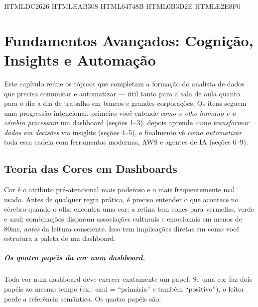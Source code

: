 
\definecolor{colAlerta}  {HTML}{DC2626}
\definecolor{colAtencao} {HTML}{EAB308}
\definecolor{colNeutra}  {HTML}{64748B}
\definecolor{colMarca}   {HTML}{0B3D2E}
\definecolor{colBgClaro} {HTML}{E2E8F0}

\chapter{Fundamentos Avançados: Cognição, Insights e Automação}
\label{ch:fundamentos}

Este capítulo reúne os tópicos que completam a formação do analista de dados que precisa comunicar e automatizar --- útil tanto para a sala de aula quanto para o dia a dia de trabalho em bancos e grandes corporações. Os itens seguem uma progressão intencional: primeiro você entende \emph{como o olho humano e o cérebro processam} um dashboard (seções 1--3), depois aprende \emph{como transformar dados em decisões} via insights (seções 4--5), e finalmente vê \emph{como automatizar} toda essa cadeia com ferramentas modernas, AWS e agentes de IA (seções 6--9).

\section{Teoria das Cores em Dashboards}
\label{sec:cores}

Cor é o atributo pré-atencional mais poderoso e o mais frequentemente mal usado. Antes de qualquer regra prática, é preciso entender o que acontece no cérebro quando o olho encontra uma cor: a retina tem cones para vermelho, verde e azul; combinações disparam associações culturais e emocionais em menos de 80ms, \emph{antes} da leitura consciente. Isso tem implicações diretas em como você estrutura a paleta de um dashboard.

\paragraph{Os quatro papéis da cor num dashboard.}
Toda cor num dashboard deve exercer exatamente um papel. Se uma cor faz dois papéis ao mesmo tempo (ex.: azul = ``primária'' e também ``positivo''), o leitor perde a referência semântica. Os quatro papéis são:


